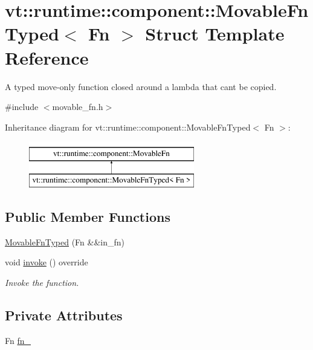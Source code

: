 \hypertarget{structvt_1_1runtime_1_1component_1_1_movable_fn_typed}{}\section{vt\+:\+:runtime\+:\+:component\+:\+:Movable\+Fn\+Typed$<$ Fn $>$ Struct Template Reference}
\label{structvt_1_1runtime_1_1component_1_1_movable_fn_typed}


A typed move-\/only function closed around a lambda that can\textquotesingle{}t be copied.  




{\ttfamily \#include $<$movable\+\_\+fn.\+h$>$}

Inheritance diagram for vt\+:\+:runtime\+:\+:component\+:\+:Movable\+Fn\+Typed$<$ Fn $>$\+:\begin{figure}[H]
\begin{center}
\leavevmode
\includegraphics[height=2.000000cm]{structvt_1_1runtime_1_1component_1_1_movable_fn_typed}
\end{center}
\end{figure}
\subsection*{Public Member Functions}
\begin{DoxyCompactItemize}
\item 
\hyperlink{structvt_1_1runtime_1_1component_1_1_movable_fn_typed_a3e4c8f91febea73dd6f3ce486fa0f5d8}{Movable\+Fn\+Typed} (Fn \&\&in\+\_\+fn)
\item 
void \hyperlink{structvt_1_1runtime_1_1component_1_1_movable_fn_typed_a3b858f98fdfd58d9a812fa23138fd513}{invoke} () override
\begin{DoxyCompactList}\small\item\em Invoke the function. \end{DoxyCompactList}\end{DoxyCompactItemize}
\subsection*{Private Attributes}
\begin{DoxyCompactItemize}
\item 
Fn \hyperlink{structvt_1_1runtime_1_1component_1_1_movable_fn_typed_ab50b89fe32be55d56b2375e4e9b14df5}{fn\+\_\+}
\end{DoxyCompactItemize}
